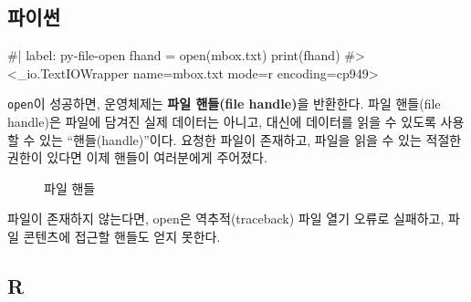 \documentclass[
  letterpaper,
]{book}
\newenvironment{Shaded}{\begin{snugshade}}{\end{snugshade}}
\newcommand{\NormalTok}[1]{\textcolor[rgb]{0.00,0.23,0.31}{#1}}
\begin{document}
\subsection{파이썬}

\begin{Shaded}
\begin{Highlighting}[]
\NormalTok{\#| label: py{-}file{-}open}
\NormalTok{fhand = open(\textquotesingle{}mbox.txt\textquotesingle{})}
\NormalTok{print(fhand)}
\NormalTok{\#\textgreater{} \textless{}\_io.TextIOWrapper name=\textquotesingle{}mbox.txt\textquotesingle{} mode=\textquotesingle{}r\textquotesingle{} encoding=\textquotesingle{}cp949\textquotesingle{}\textgreater{}}
\end{Highlighting}
\end{Shaded}

\texttt{open}이 성공하면, 운영체제는 \textbf{파일 핸들(file handle)}을
반환한다. 파일 핸들(file handle)은 파일에 담겨진 실제 데이터는 아니고,
대신에 데이터를 읽을 수 있도록 사용할 수 있는 ``핸들(handle)''이다.
요청한 파일이 존재하고, 파일을 읽을 수 있는 적절한 권한이 있다면 이제
핸들이 여러분에게 주어졌다. 

\begin{figure}


\caption{\label{fig-file-handler}파일 핸들}

\end{figure}%

파일이 존재하지 않는다면, open은 역추적(traceback) 파일 열기 오류로
실패하고, 파일 콘텐츠에 접근할 핸들도 얻지 못한다.

\subsection{R}
\end{document}
